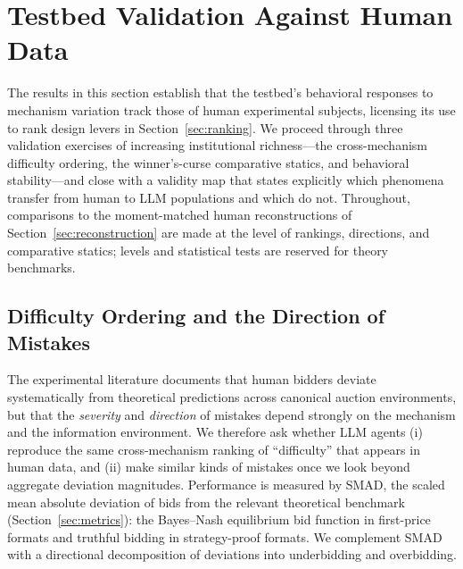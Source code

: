 
\section{Testbed Validation Against Human Data}\label{sec:validation}

The results in this section establish that the testbed's behavioral responses to mechanism variation track those of human experimental subjects, licensing its use to rank design levers in Section~\ref{sec:ranking}. We proceed through three validation exercises of increasing institutional richness---the cross-mechanism difficulty ordering, the winner's-curse comparative statics, and behavioral stability---and close with a validity map that states explicitly which phenomena transfer from human to LLM populations and which do not. Throughout, comparisons to the moment-matched human reconstructions of Section~\ref{sec:reconstruction} are made at the level of rankings, directions, and comparative statics; levels and statistical tests are reserved for theory benchmarks.

\subsection{Difficulty Ordering and the Direction of Mistakes}\label{sec:validation-difficulty}

The experimental literature documents that human bidders deviate systematically from theoretical predictions across canonical auction environments, but that the \emph{severity} and \emph{direction} of mistakes depend strongly on the mechanism and the information environment. We therefore ask whether LLM agents (i) reproduce the same cross-mechanism ranking of ``difficulty'' that appears in human data, and (ii) make similar kinds of mistakes once we look beyond aggregate deviation magnitudes. Performance is measured by SMAD, the scaled mean absolute deviation of bids from the relevant theoretical benchmark (Section~\ref{sec:metrics}): the Bayes--Nash equilibrium bid function in first-price formats and truthful bidding in strategy-proof formats. We complement SMAD with a directional decomposition of deviations into underbidding and overbidding.

